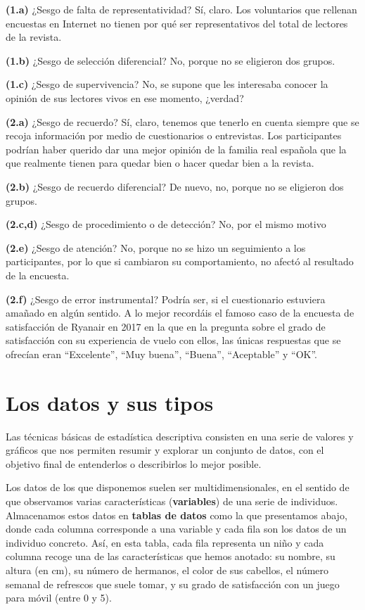 \documentclass[
  spanish,
  letterpaper,
  DIV=11,
  numbers=noendperiod]{scrreprt}
\begin{document}
\textbf{(1.a)} ¿Sesgo de falta de representatividad? Sí, claro. Los
voluntarios que rellenan encuestas en Internet no tienen por qué ser
representativos del total de lectores de la revista.

\textbf{(1.b)} ¿Sesgo de selección diferencial? No, porque no se
eligieron dos grupos.

\textbf{(1.c)} ¿Sesgo de supervivencia? No, se supone que les interesaba
conocer la opinión de sus lectores vivos en ese momento, ¿verdad?

\textbf{(2.a)} ¿Sesgo de recuerdo? Sí, claro, tenemos que tenerlo en
cuenta siempre que se recoja información por medio de cuestionarios o
entrevistas. Los participantes podrían haber querido dar una mejor
opinión de la familia real española que la que realmente tienen para
quedar bien o hacer quedar bien a la revista.

\textbf{(2.b)} ¿Sesgo de recuerdo diferencial? De nuevo, no, porque no
se eligieron dos grupos.

\textbf{(2.c,d)} ¿Sesgo de procedimiento o de detección? No, por el
mismo motivo

\textbf{(2.e)} ¿Sesgo de atención? No, porque no se hizo un seguimiento
a los participantes, por lo que si cambiaron su comportamiento, no
afectó al resultado de la encuesta.

\textbf{(2.f)} ¿Sesgo de error instrumental? Podría ser, si el
cuestionario estuviera amañado en algún sentido. A lo mejor recordáis el
famoso caso de la encuesta de satisfacción de Ryanair en 2017 en la que
en la pregunta sobre el grado de satisfacción con su experiencia de
vuelo con ellos, las únicas respuestas que se ofrecían eran
``Excelente'', ``Muy buena'', ``Buena'', ``Aceptable'' y ``OK''.


\chapter{Los datos y sus tipos}\label{los-datos-y-sus-tipos}

Las técnicas básicas de estadística descriptiva consisten en una serie
de valores y gráficos que nos permiten resumir y explorar un conjunto de
datos, con el objetivo final de entenderlos o describirlos lo mejor
posible.

Los datos de los que disponemos suelen ser multidimensionales, en el
sentido de que observamos varias características (\textbf{variables}) de
una serie de individuos. Almacenamos estos datos en \textbf{tablas de
datos} como la que presentamos abajo, donde cada columna corresponde a
una variable y cada fila son los datos de un individuo concreto. Así, en
esta tabla, cada fila representa un niño y cada columna recoge una de
las características que hemos anotado: su nombre, su altura (en cm), su
número de hermanos, el color de sus cabellos, el número semanal de
refrescos que suele tomar, y su grado de satisfacción con un juego para
móvil (entre 0 y 5).
\end{document}
